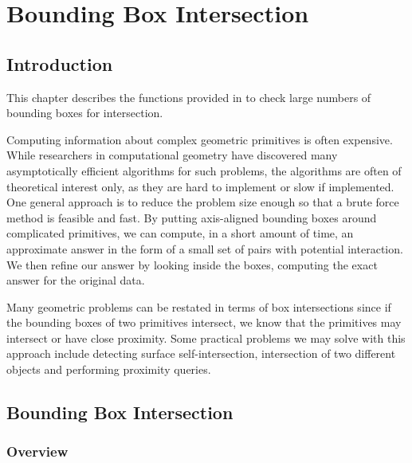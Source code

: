 \chapter*{Bounding Box Intersection}

\section*{Introduction} 
This chapter describes the functions provided in \cgal{} 
to check large numbers of bounding boxes for intersection.

Computing information about complex geometric primitives is often expensive. While researchers in computational geometry have discovered many asymptotically efficient algorithms for such problems, the algorithms are often of theoretical interest only, as they are hard to implement or slow if implemented. One general approach is to reduce the problem size enough so that a brute force method is feasible and fast. By putting axis-aligned bounding boxes around complicated primitives, we can compute, in a short amount of time, an approximate answer in the form of a small set of pairs with potential interaction.  We then refine our answer by looking inside the boxes, computing the exact answer for the original data.

Many geometric problems can be restated in terms of box intersections since if the bounding boxes of two primitives intersect, we know that the primitives may intersect or have close proximity. Some practical problems we may solve with this approach include detecting surface self-intersection, intersection of two different objects and performing proximity queries. 

\section*{Bounding Box Intersection}
\subsection*{Overview}


